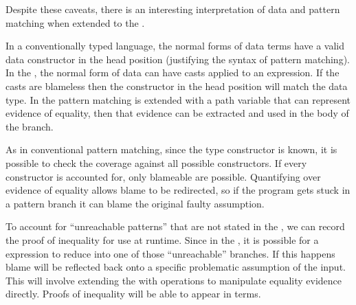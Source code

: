 Despite these caveats, there is an interesting interpretation of data and pattern matching when extended to the \csys{}.

In a conventionally typed language, the normal forms of data terms have a valid data constructor in the head position (justifying the syntax of pattern matching).
In the \clang{}, the normal form of data can have casts applied to an expression.
If the casts are blameless then the constructor in the head position will match the data type.
In the \clang{} pattern matching is extended with a path variable that can represent evidence of equality, then that evidence can be extracted and used in the body of the branch.

As in conventional pattern matching, since the type constructor is known, it is possible to check the coverage against all possible constructors.
If every constructor is accounted for, only blameable \scruts{} are possible.
Quantifying over evidence of equality allows blame to be redirected, so if the program gets stuck in a pattern branch it can blame the original faulty assumption.

To account for ``unreachable patterns'' that are not stated in the \slang, we can record the proof of inequality for use at runtime.
Since in the \clang{}, it is possible for a \case{} expression to reduce into one of those ``unreachable'' branches.
If this happens blame will be reflected back onto a specific problematic assumption of the input.
This will involve extending the \clang{} with operations to manipulate equality evidence directly.
Proofs of inequality will be able to appear in terms.
 









% 


